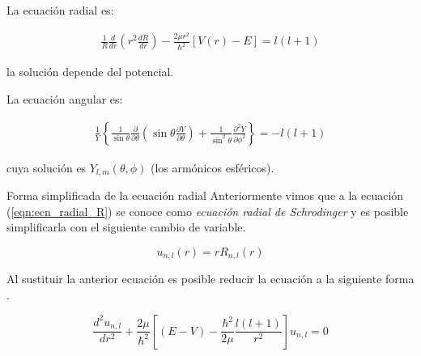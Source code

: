 \begin{frame}{}

    \begin{tcolorbox}[colback=blue!5!white, colframe =blue!75!black, title= Ecuaciones separadas \cite{griffiths2018introduction}]
    
        La ecuación radial es:
        
        \begin{align}
            \frac{1}{R} \frac{d}{dr} \left( r^2 \frac{dR}{dr} \right) - \frac{2\mu r^2}{\hbar^2} \left[ V(r) - E \right] = l(l+1)
            \label{eqn:ecn_radial_R}
        \end{align}
        
        la solución depende del potencial.
        
        La ecuación angular es:
        
        \begin{align}
            \frac{1}{Y} \left\{ \frac{1}{\sin{\theta}} \frac{\partial}{\partial \theta} \left(  \sin{\theta} \frac{ \partial Y}{\partial \theta} \right) + \frac{1}{\sin^2{\theta}} \frac{\partial^2 Y }{ \partial \phi^2 } \right\} = -l(l+1)
            \label{eqn:ecn_angular_Y}
        \end{align}
        
        cuya solución es $Y_{l,m} ( \theta, \phi ) $ (los armónicos esféricos).
        
    \end{tcolorbox}
    
\end{frame}


\begin{frame}{Forma simplificada de la ecuación radial}
    Anteriormente vimos que a la ecuación (\ref{eqn:ecn_radial_R}) se conoce como \emph{ecuación radial de Schrodinger} y es posible simplificarla con el siguiente cambio de variable.

    \begin{equation}
        u_{n,l}(r) = r R_{n,l} (r)
    \end{equation}

    Al sustituir la anterior ecuación es posible reducir la ecuación a la siguiente forma \cite{griffiths2018introduction}.
    
    \begin{equation}
        \frac{d^2 u_{n,l}}{dr^2} + \frac{2\mu}{\hbar^2} \left[
            (E-V) - \frac{\hbar^2}{2\mu} \frac{l(l+1)}{r^2}
        \right] u_{n,l}
        = 
        0
        \label{eqn:ecn_radial_u}
    \end{equation}

\end{frame}



